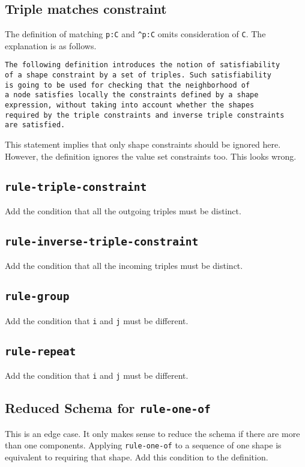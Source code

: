 \documentclass{article}
\begin{document}
\subsection{Triple matches constraint}
The definition of matching {\tt p:C} and {\tt \verb+^+p:C} omits consideration of {\tt C}.
The explanation is as follows.

\begin{verbatim}
The following definition introduces the notion of satisfiability 
of a shape constraint by a set of triples. Such satisfiability 
is going to be used for checking that the neighborhood of 
a node satisfies locally the constraints defined by a shape 
expression, without taking into account whether the shapes 
required by the triple constraints and inverse triple constraints 
are satisfied.
\end{verbatim}

This statement implies that only shape constraints should be ignored here.
However, the definition ignores the value set constraints too.
This looks wrong.

\subsection{{\tt rule-triple-constraint}}
Add the condition that all the outgoing triples must be distinct.

\subsection{{\tt rule-inverse-triple-constraint}}
Add the condition that all the incoming triples must be distinct.

\subsection{{\tt rule-group}}
Add the condition that {\tt i} and {\tt j} must be different.

\subsection{{\tt rule-repeat}}
Add the condition that {\tt i} and {\tt j} must be different.

\subsection{Reduced Schema for {\tt rule-one-of}}
This is an edge case.
It only makes sense to reduce the schema if there are more than one components.
Applying {\tt rule-one-of} to a sequence of one shape is equivalent to requiring that shape.
Add this condition to the definition.
\end{document}
